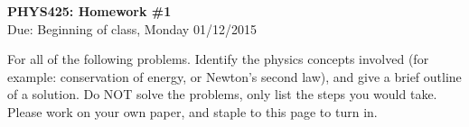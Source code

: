 \documentclass[10pt]{article}
\begin{document}
\thispagestyle{empty}
\makebox{\hspace{1cm}}
\vspace{-0.5in}
\begin{center}
{\Large \bf PHYS425: Homework \#1} \\
Due: Beginning of class, Monday 01/12/2015
\end{center}


\vspace{0.5cm}

\vspace{0.5cm}
For all of the following problems. Identify the physics concepts involved (for example: conservation of energy, or Newton's second law), and give a brief outline of a solution. Do NOT solve the problems, only list the steps you would take. Please work on your own paper, and staple to this page to turn in.
\end{document}
